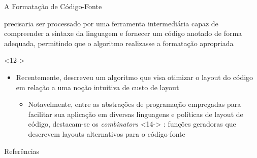 \documentclass
  [ aspectratio=169,
    english,
    hyperref={citecolor=blue,colorlinks=true,linkcolor=blue,urlcolor=blue},
    brazil]
  {beamer}
\begin{document}
\begin{frame}{A Formatação de Código-Fonte}
{\begin{itemize}
\begin{itemize}
                                  precisaria ser processado por uma ferramenta
                                  intermediária capaz de compreender a sintaxe
                                  da linguagem e fornecer um código anotado de
                                  forma adequada, permitindo que o algoritmo
                                  realizasse a formatação apropriada
                    \end{itemize}
        \end{itemize}}%
    \only
      <12->
      { \begin{itemize}
          \item<12->  Recentemente, \textcite{yelland-2015-new} descreveu um
                      algoritmo que visa otimizar o layout do código em relação
                      a uma noção intuitiva de custo de layout
                      \begin{itemize}
                        \item<13->  Notavelmente, entre as abstrações de
                                    programação empregadas para facilitar sua
                                    aplicação em diversas linguagens e
                                    políticas de layout de código, destacam-se
                                    os \textit{combinators}%
                                    \onslide
                                      <14->
                                      {%
                                        : funções geradoras que descrevem
                                        layouts alternativos para o
                                        código-fonte}
                      \end{itemize}
        \end{itemize}}
  \end{frame}

  \begin{frame}{Referências}\printbibliography\end{frame}
\end{document}
